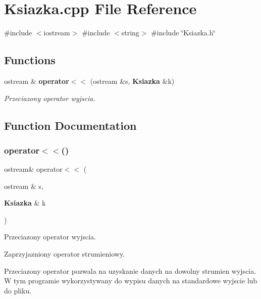 \section{Ksiazka.\+cpp File Reference}
\label{_ksiazka_8cpp}
{\ttfamily \#include $<$iostream$>$}\newline
{\ttfamily \#include $<$string$>$}\newline
{\ttfamily \#include \char`\"{}Ksiazka.\+h\char`\"{}}\newline
\subsection*{Functions}
\begin{DoxyCompactItemize}
\item 
ostream \& \textbf{ operator$<$$<$} (ostream \&s, \textbf{ Ksiazka} \&k)
\begin{DoxyCompactList}\small\item\em Przeciazony operator wyjscia. \end{DoxyCompactList}\end{DoxyCompactItemize}


\subsection{Function Documentation}
\mbox{\label{_ksiazka_8cpp_a6304f50ce62c067a686efe441f71c54d}} 
\subsubsection{operator$<$$<$()}
{\footnotesize\ttfamily ostream\& operator$<$$<$ (\begin{DoxyParamCaption}\item[{ostream \&}]{s,  }\item[{\textbf{ Ksiazka} \&}]{k }\end{DoxyParamCaption})}



Przeciazony operator wyjscia. 

Zaprzyjazniony operator strumieniowy.

Przeciazony operator pozwala na uzyskanie danych na dowolny strumien wyjscia. W tym programie wykorzystywany do wypisu danych na standardowe wyjscie lub do pliku. 
